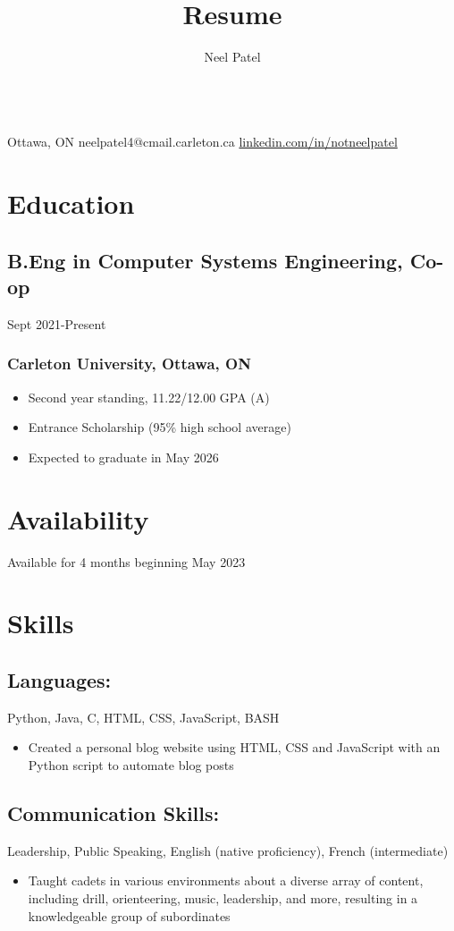 \documentclass{article}
\makeatletter
\renewcommand{\maketitle}{

\begin{center}
{
\huge\bfseries
\theauthor}
\\
\vspace{0.25em}
Ottawa, ON
\textbar
{ neelpatel4@cmail.carleton.ca}
\textbar
{ \url{linkedin.com/in/notneelpatel}} 
\end{center}
}
\newenvironment{itemlist}
{\begin{itemize}
	\setlength{\itemsep}{0em}
	\setlength{\parskip}{0em}
	\setlength{\parsep}{0em}
}
{\end{itemize}}
\makeatother
\begin{document}
\title{Resume}
\author{Neel Patel}

\maketitle

\section{Education}
\subsection{B.Eng in Computer Systems Engineering, Co-op}\hfill{Sept 2021-Present}
\subsubsection{Carleton University, Ottawa, ON}

\begin{itemlist}
\item Second year standing, 11.22/12.00 GPA (A)
\item Entrance Scholarship (95\% high school average)
\item Expected to graduate in May 2026
\end{itemlist}

\section{Availability}
Available for 4 months beginning May 2023

\section{Skills}
\subsection{Languages: } {Python, Java, C, HTML, CSS, JavaScript, BASH}
\begin{itemlist}
\item Created a personal blog website using HTML, CSS and JavaScript with an Python script to automate blog posts
\end{itemlist}

\subsection{Communication Skills: } {Leadership, Public Speaking, English (native proficiency), French (intermediate)}
\begin{itemlist}
\item Taught cadets in various environments about a diverse array of content, including drill, orienteering, music, leadership, and more, resulting in a knowledgeable group of subordinates 
\end{itemlist}
\end{document}
